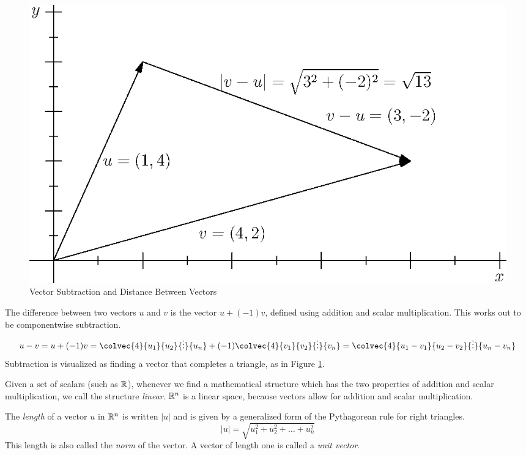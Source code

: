 \documentclass[fleqn,letterpaper]{report}
\begin{document}
\begin{figure}[t]
\centering
\includegraphics[scale=1]{figure06.eps}
\caption{Vector Subtraction and Distance Between Vectors}
\label{figure-vector-subtraction}
\end{figure}

\begin{defn}
The difference between two vectors $u$ and $v$ is the vector $u +
(-1)v$, defined using addition and scalar multiplication. This
works out to be componentwise subtraction.
\begin{equation*}
u - v = u + (-1) v= \colvec{4}{u_1}{u_2}{\vdots}{u_n} + (-1)
\colvec{4}{v_1}{v_2}{\vdots}{v_n} = \colvec{4}{u_1 - v_1}{u_2
- v_2}{\vdots}{u_n - v_n}
\end{equation*}
Subtraction is visualized as finding a vector that completes a
triangle, as in Figure \ref{figure-vector-subtraction}. 
\end{defn}

\begin{defn}
Given a set of scalars (such as $\mathbb{R}$), whenever we find a
mathematical structure which has the two properties of
addition and scalar multiplication, we call the structure
\emph{linear}. $\mathbb{R}^n$ is a linear space, because vectors
allow for addition and scalar multiplication.
\end{defn}

\begin{defn}
The \emph{length} of a vector $u$ in
$\mathbb{R}^n$ is written $|u|$ and is given by a generalized form of
the Pythagorean rule for right triangles.
\begin{equation*}
|u| = \sqrt{u_1^2 + u_2^2 + \ldots + u_n^2}
\end{equation*}
This length is also called the \emph{norm} of the vector.
A vector of length one is called a \emph{unit vector}.
\end{defn}
\end{document}
